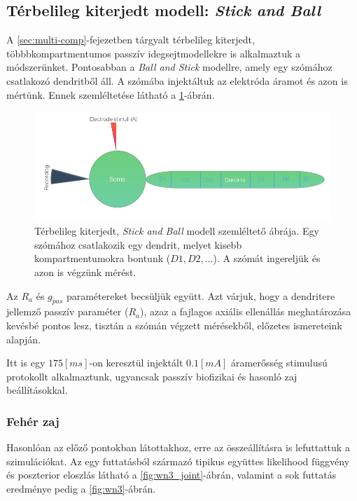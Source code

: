 \clearpage
\subsection{Térbelileg kiterjedt modell: \textit{Stick and Ball}}
A \ref{sec:multi-comp}-fejezetben tárgyalt térbelileg kiterjedt, többbkompartmentumos passzív idegsejtmodellekre is alkalmaztuk a módszerünket. Pontosabban a \textit{Ball and Stick} modellre, amely egy szómához csatlakozó dendritből áll. A szómába injektáltuk az elektróda áramot és azon is mértünk. Ennek szemléltetése látható a \ref{fig:spatial}-ábrán.

\begin{figure}[h!]
	\centering
	\includegraphics[width=0.9\linewidth]{fig/models/spatial}
	\caption[Többkompartmentumos modell szemléltetése]{Térbelileg kiterjedt, \textit{Stick and Ball} modell szemléltető ábrája. Egy szómához csatlakozik egy dendrit, melyet kisebb kompartmentumokra bontunk ($D1,D2,...$). A szómát ingereljük és azon is végzünk mérést.}
	\label{fig:spatial}
\end{figure}

Az $R_a$ és $g_{pas}$ paramétereket becsüljük együtt. Azt várjuk, hogy a dendritere jellemző passzív paraméter ($R_a$), azaz a fajlagos axiális ellenállás meghatározása kevésbé pontos lesz, tisztán a szómán végzett mérésekből, előzetes ismereteink alapján.

Itt is egy $175 \left[ms\right]$-on keresztül injektált $0.1 \left[mA\right]$ áramerősség stimulusú protokollt alkalmaztunk, ugyancsak passzív biofizikai és hasonló zaj beállításokkal.


\subsubsection{Fehér zaj}
Hasonlóan az előző pontokban látottakhoz, erre az összeállításra is lefuttattuk a szimulációkat. Az egy futtatásból származó tipikus együttes likelihood függvény és poszterior eloszlás látható a \ref{fig:wn3_joint}-ábrán, valamint a sok futtatás eredménye pedig a \ref{fig:wn3}-ábrán.

